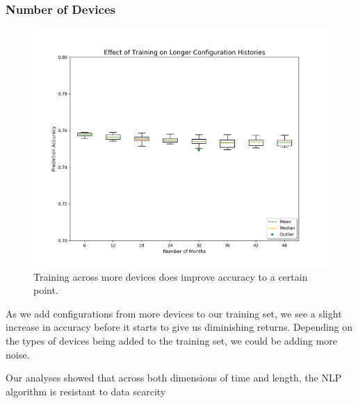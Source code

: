 \subsubsection{Number of Devices}
\begin{figure}[H]
	\centering
	\includegraphics[width=\textwidth]{time.png}
	\caption{Training across more devices does improve accuracy to a certain point.}
\end{figure}

As we add configurations from more devices to our training set, we see a slight increase in accuracy before it starts to give us diminishing returns. Depending on the types of devices being added to the training set, we could be adding more noise.


Our analyses showed that across both dimensions of time and length, the NLP algorithm is resistant to data scarcity